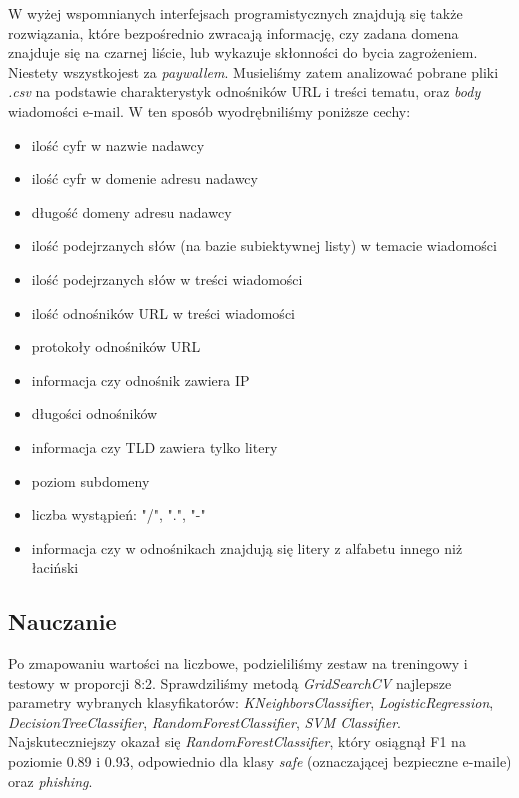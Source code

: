 \documentclass[]{article}
\begin{document}
W wyżej wspomnianych interfejsach programistycznych znajdują się także rozwiązania, które bezpośrednio zwracają informację, czy zadana domena znajduje się na czarnej liście, lub wykazuje skłonności do bycia zagrożeniem. Niestety wszystkojest za \textit{paywallem}. Musieliśmy zatem analizować pobrane pliki \textit{.csv} na podstawie charakterystyk odnośników URL i treści tematu, oraz \textit{body} wiadomości e-mail. W ten sposób wyodrębniliśmy poniższe cechy:

\begin{itemize}[label=$\rightarrow$]
	\item ilość cyfr w nazwie nadawcy
	\item ilość cyfr w domenie adresu nadawcy
	\item długość domeny adresu nadawcy
	\item ilość podejrzanych słów (na bazie subiektywnej listy) w temacie wiadomości
	\item ilość podejrzanych słów w treści wiadomości
	\item ilość odnośników URL w treści wiadomości
	\item protokoły odnośników URL
	\item informacja czy odnośnik zawiera IP
	\item długości odnośników
	\item informacja czy TLD zawiera tylko litery
	\item poziom subdomeny
	\item liczba wystąpień: "/", ".", "-"
	\item informacja czy w odnośnikach znajdują się litery z alfabetu innego niż łaciński
\end{itemize}

\subsection{Nauczanie}
Po zmapowaniu wartości na liczbowe, podzieliliśmy zestaw na treningowy i testowy w proporcji 8:2. Sprawdziliśmy metodą \textit{GridSearchCV} najlepsze parametry wybranych klasyfikatorów: \textit{KNeighborsClassifier}, \textit{LogisticRegression}, \textit{DecisionTreeClassifier}, \textit{RandomForestClassifier}, \textit{SVM Classifier}. Najskuteczniejszy okazał się \textit{RandomForestClassifier}, który osiągnął F1 na poziomie 0.89 i 0.93, odpowiednio dla klasy \textit{safe} (oznaczającej bezpieczne e-maile) oraz \textit{phishing}.



\end{document}

